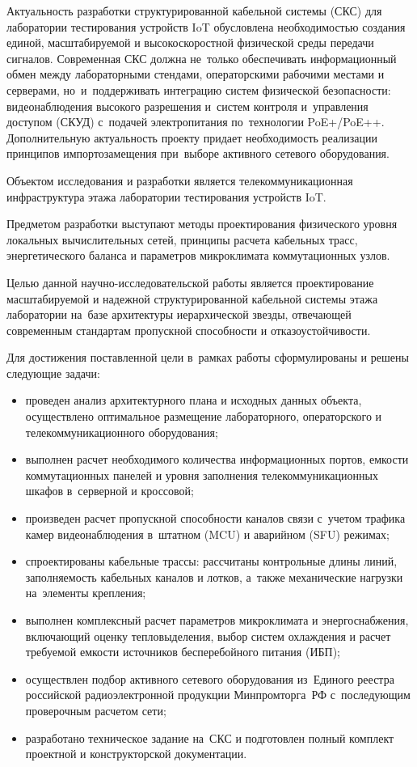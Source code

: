 \documentclass{bmstu}
\begin{document}
Актуальность разработки структурированной кабельной системы (СКС) для лаборатории тестирования устройств IoT обусловлена необходимостью создания единой, масштабируемой и высокоскоростной физической среды передачи сигналов. Современная СКС должна не~только обеспечивать информационный обмен между лабораторными стендами, операторскими рабочими местами и серверами, но~и~поддерживать интеграцию систем физической безопасности: видеонаблюдения высокого разрешения и~систем контроля и~управления доступом (СКУД) с~подачей электропитания по~технологии PoE+/PoE++. Дополнительную актуальность проекту придает необходимость реализации принципов импортозамещения при~выборе активного сетевого оборудования.

Объектом исследования и разработки является телекоммуникационная инфраструктура этажа лаборатории тестирования устройств IoT.

Предметом разработки выступают методы проектирования физического уровня локальных вычислительных сетей, принципы расчета кабельных трасс, энергетического баланса и параметров микроклимата коммутационных узлов.

Целью данной научно-исследовательской работы является проектирование масштабируемой и надежной структурированной кабельной системы этажа лаборатории на~базе архитектуры иерархической звезды, отвечающей современным стандартам пропускной способности и отказоустойчивости.

Для достижения поставленной цели в~рамках работы сформулированы и решены следующие задачи:
\begin{itemize}
    \item проведен анализ архитектурного плана и исходных данных объекта, осуществлено оптимальное размещение лабораторного, операторского и телекоммуникационного оборудования;
    \item выполнен расчет необходимого количества информационных портов, емкости коммутационных панелей и уровня заполнения телекоммуникационных шкафов в~серверной и кроссовой;
    \item произведен расчет пропускной способности каналов связи с~учетом трафика камер видеонаблюдения в~штатном (MCU) и аварийном (SFU) режимах;
    \item спроектированы кабельные трассы: рассчитаны контрольные длины линий, заполняемость кабельных каналов и лотков, а~также механические нагрузки на~элементы крепления;
    \item выполнен комплексный расчет параметров микроклимата и энергоснабжения, включающий оценку тепловыделения, выбор систем охлаждения и расчет требуемой емкости источников бесперебойного питания (ИБП);
    \item осуществлен подбор активного сетевого оборудования из~Единого реестра российской радиоэлектронной продукции Минпромторга~РФ с~последующим проверочным расчетом сети;
    \item разработано техническое задание на~СКС и подготовлен полный комплект проектной и конструкторской документации.
\end{itemize}
\end{document}
